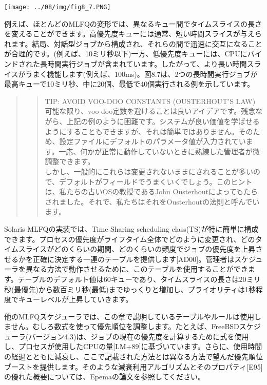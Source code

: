 \texttt{[image: ../08/img/fig8\_7.PNG]}

例えば、ほとんどのMLFQの変形では、異なるキュー間でタイムスライスの長さを変えることができます。高優先度キューには通常、短い時間スライスが与えられます。結局、対話型ジョブから構成され、それらの間で迅速に交互になることが合理的です。(例えば、10ミリ秒以下)一方、低優先度キューには、CPUにバインドされた長時間実行ジョブが含まれています。したがって、より長い時間スライスがうまく機能します(例えば、100ms)。図8.7は、2つの長時間実行ジョブが最高キューで10ミリ秒、中に20個、最低で40個実行される例を示しています。

\begin{quote}
\begin{quote}
TIP: AVOID VOO-DOO CONSTANTS (OUSTERHOUT'S LAW)\\
可能な限り、voo-doo定数を避けることは良いアイデアです。残念ながら、上記の例のように困難です。システムが良い価値を学ばせるようにすることもできますが、それは簡単ではありません。そのため、設定ファイルにデフォルトのパラメータ値が入力されています。一応、何かが正常に動作していないときに熟練した管理者が微調整できます。\\
しかし、一般的にこれらは変更されないままにされることが多いので、デフォルトがフィールドでうまくいくでしょう。このヒントは、私たちの古いOSの教授であるJohn
Ousterhoutによってもたらされました。それで、私たちはそれをOusterhoutの法則と呼んでいます。
\end{quote}
\end{quote}

Solaris MLFQの実装では、Time Sharing scheduling
class(TS)が特に簡単に構成できます。プロセスの優先度がライフタイム全体でどのように変更され、どのタイムスライスがどのくらいの期間、どのくらいの頻度でジョブの優先度を上昇させるかを正確に決定する一連のテーブルを提供します{[}AD00{]}。管理者はスケジューラを異なる方法で動作させるために、このテーブルを使用することができます。テーブルのデフォルト値は60キューであり、タイムスライスの長さは20ミリ秒(最優先)から数百ミリ秒(最低)までゆっくりと増加し、プライオリティは1秒程度でキューレベルが上昇していきます。

他のMLFQスケジューラでは、この章で説明しているテーブルやルールは使用しません。むしろ数式を使って優先順位を調整します。たとえば、FreeBSDスケジューラ(バージョン4.3)は、ジョブの現在の優先度を計算するために式を使用し、プロセスが使用したCPUの量{[}LM+89{]}に基づいています。さらに、使用時間の経過とともに減衰し、ここで記載された方法とは異なる方法で望んだ優先順位ブーストを提供します。そのような減衰利用アルゴリズムとそのプロパティ{[}E95{]}の優れた概要については、Epemaの論文を参照してください。

